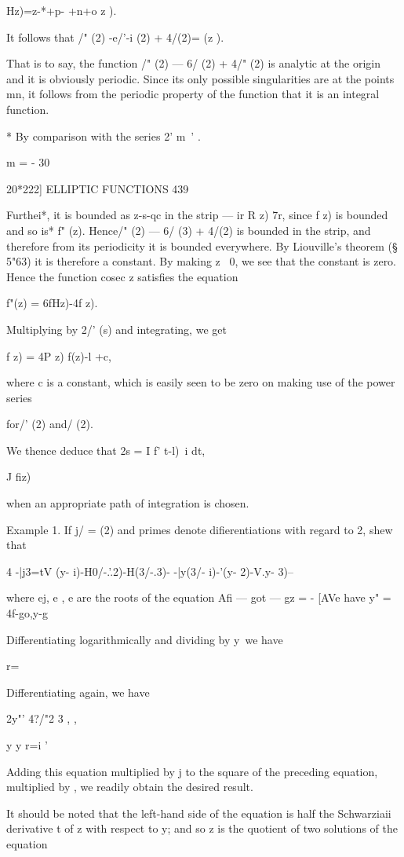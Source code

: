 { Hz)=z-*+p- +n+o z ).

It follows that /" (2) -e/'-i (2) + 4/(2)= (z ).

That is to say, the function /" (2) — 6/ (2) + 4/" (2) is analytic at
the origin and it is obviously periodic. Since its only possible
singularities are at the points mn, it follows from the periodic
property of the function that it is an integral function.

* By comparison with the series 2' m~' .

m = - 30

20*222] ELLIPTIC FUNCTIONS 439

Furthei*, it is bounded as z-s-qc in the strip — ir R z) 7r, since f
z) is bounded and so is* f" (z). Hence/" (2) — 6/ (3) + 4/(2) is
bounded in the strip, and therefore from its periodicity it is bounded
everywhere. By Liouville's theorem (§ 5"63) it is therefore a
constant. By making z ~0, we see that the constant is zero. Hence the
function cosec z satisfies the equation

f"(z) = 6fHz)-4f z).

Multiplying by 2/' (s) and integrating, we get

f z) = 4P z) f(z)-l +c,

where c is a constant, which is easily seen to be zero on making use
of the power series

for/' (2) and/ (2).

We thence deduce that 2s = I f' t-l)~i dt,

J fiz)

when an appropriate path of integration is chosen.

Example 1. If j/ = (2) and primes denote difierentiations with regard
to 2, shew that

4 -|j3=tV (y- i)-H0/-.'.2)-H(3/-.3)- -|y(3/- i)-'(y- 2)-V.y- 3)--\

where ej, e , e are the roots of the equation Afi — got — gz = - [AVe
have y" = 4f-go,y-g

Differentiating logarithmically and dividing by y\ we have

r=\

Differentiating again, we have

2y"' 4?/"2 3 , ,

y y r=i '

Adding this equation multiplied by j to the square of the preceding
equation, multiplied by , we readily obtain the desired result.

It should be noted that the left-hand side of the equation is half the
Schwarziaii derivative t of z with respect to y; and so z is the
quotient of two solutions of the equation

}
